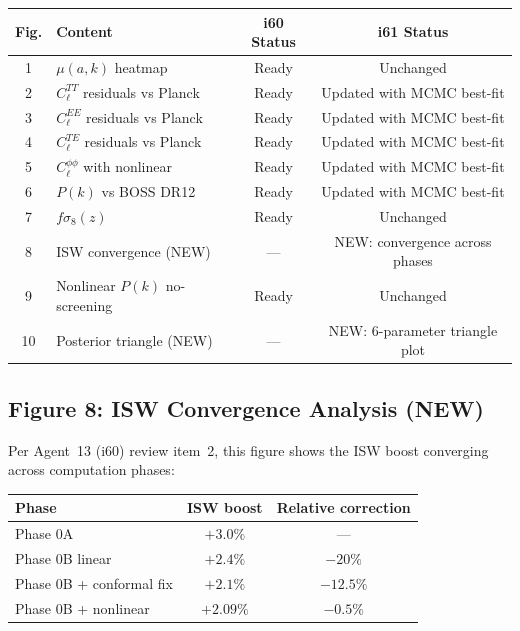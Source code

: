 \documentclass[11pt,a4paper]{article}
\begin{document}
\begin{center}
\begin{longtable}{clcc}
\toprule
\textbf{Fig.} & \textbf{Content} & \textbf{i60 Status} & \textbf{i61 Status} \\
\midrule
1 & $\mu(a,k)$ heatmap & Ready & Unchanged \\
2 & $C_\ell^{TT}$ residuals vs Planck & Ready & Updated with MCMC best-fit \\
3 & $C_\ell^{EE}$ residuals vs Planck & Ready & Updated with MCMC best-fit \\
4 & $C_\ell^{TE}$ residuals vs Planck & Ready & Updated with MCMC best-fit \\
5 & $C_\ell^{\phi\phi}$ with nonlinear & Ready & Updated with MCMC best-fit \\
6 & $P(k)$ vs BOSS DR12 & Ready & Updated with MCMC best-fit \\
7 & $f\sigma_8(z)$ & Ready & Unchanged \\
8 & ISW convergence (NEW) & --- & NEW: convergence across phases \\
9 & Nonlinear $P(k)$ no-screening & Ready & Unchanged \\
10 & Posterior triangle (NEW) & --- & NEW: 6-parameter triangle plot \\
\bottomrule
\end{longtable}
\end{center}

\subsection{Figure 8: ISW Convergence Analysis (NEW)}

Per Agent~13 (i60) review item~2, this figure shows the ISW boost converging across computation phases:

\begin{center}
\begin{tabular}{lcc}
\toprule
\textbf{Phase} & \textbf{ISW boost} & \textbf{Relative correction} \\
\midrule
Phase 0A & $+3.0\%$ & --- \\
Phase 0B linear & $+2.4\%$ & $-20\%$ \\
Phase 0B + conformal fix & $+2.1\%$ & $-12.5\%$ \\
Phase 0B + nonlinear & $+2.09\%$ & $-0.5\%$ \\
\bottomrule
\end{tabular}
\end{center}
\end{document}
